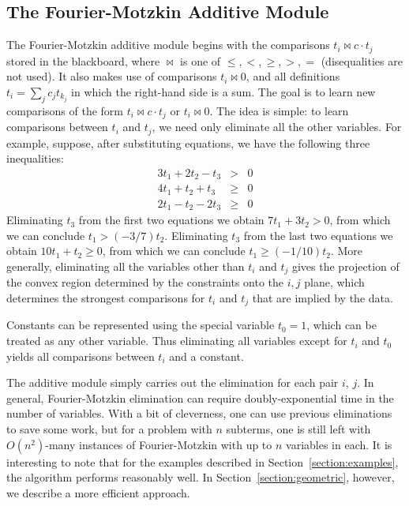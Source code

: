 \documentclass[runningheds]{llncs}
\begin{document}
\subsection{The Fourier-Motzkin Additive Module}
\label{subsection:fm:additive}

The Fourier-Motzkin additive module begins with the comparisons $t_i \bowtie c \cdot t_j$ stored in the blackboard, where $\bowtie$ is one of $\leq, <, \geq, >, =$ (disequalities are not used). It also makes use of comparisons $t_i \bowtie 0$, and all definitions $t_i = \sum_j c_j t_{k_j}$ in which the right-hand side is a sum. The goal is to learn new comparisons of the form $t_i \bowtie c \cdot t_j$ or $t_i \bowtie 0$. The idea is simple: to learn comparisons between $t_i$ and $t_j$, we need only eliminate all the other variables. 
For example, suppose, after substituting equations, we have the following three inequalities:
\begin{eqnarray*}
 3 t_1 + 2 t_2 - t_3 & > & 0 \\
 4 t_1 + t_2 + t_3 & \geq & 0 \\
 2 t_1 - t_2 - 2 t_3 & \geq & 0 
\end{eqnarray*}
Eliminating $t_3$ from the first two equations we obtain $7 t_1 + 3 t_2 > 0$, from which we can conclude $t_1 > (-3 / 7) t_2$. Eliminating $t_3$ from the last two equations we obtain $10 t_1 + t_2 \geq 0$, from which we can conclude $t_1 \geq (-1 / 10) t_2$. More generally, eliminating all the variables other than $t_i$ and $t_j$ gives the projection of the convex region determined by the constraints onto the $i, j$ plane, which determines the strongest comparisons for $t_i$ and $t_j$ that are implied by the data.

Constants can be represented using the special variable $t_0=1$, which
can be treated as any other variable. Thus eliminating all variables except for $t_i$ and $t_0$ yields all comparisons between $t_i$ and a constant.





The additive module simply carries out the elimination for each pair
$i$, $j$. In general, Fourier-Motzkin elimination can
require doubly-exponential time in the number of variables.  With a bit of cleverness, one can use previous eliminations to save some work, but for a problem with $n$ subterms, one is still left with $O(n^2)$-many instances of Fourier-Motzkin with up to $n$ variables in each. 
It is interesting to note that for the examples described in
Section~\ref{section:examples}, the algorithm performs reasonably
well. In Section~\ref{section:geometric}, however, we describe a more
efficient approach.
\end{document}
